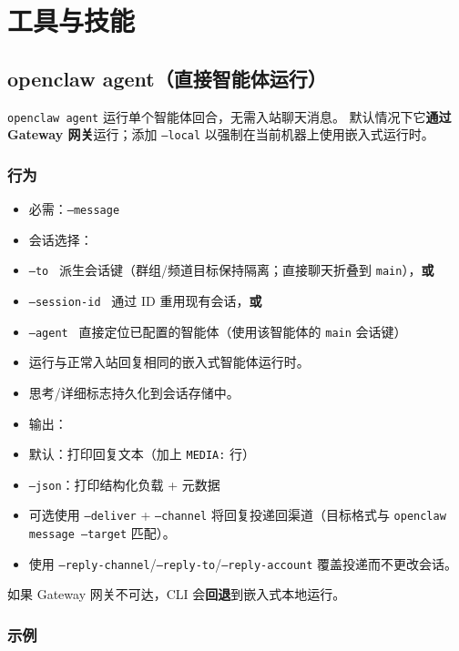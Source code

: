 \chapter{工具与技能}

\section{openclaw agent（直接智能体运行）}


\texttt{openclaw agent} 运行单个智能体回合，无需入站聊天消息。
默认情况下它\textbf{通过 Gateway 网关}运行；添加 \texttt{--local} 以强制在当前机器上使用嵌入式运行时。

\subsection{行为}


\begin{itemize}
  \item 必需：\texttt{--message }
  \item 会话选择：
  \item \texttt{--to } 派生会话键（群组/频道目标保持隔离；直接聊天折叠到 \texttt{main}），\textbf{或}
  \item \texttt{--session-id } 通过 ID 重用现有会话，\textbf{或}
  \item \texttt{--agent } 直接定位已配置的智能体（使用该智能体的 \texttt{main} 会话键）
  \item 运行与正常入站回复相同的嵌入式智能体运行时。
  \item 思考/详细标志持久化到会话存储中。
  \item 输出：
  \item 默认：打印回复文本（加上 \texttt{MEDIA:} 行）
  \item \texttt{--json}：打印结构化负载 + 元数据
  \item 可选使用 \texttt{--deliver} + \texttt{--channel} 将回复投递回渠道（目标格式与 \texttt{openclaw message --target} 匹配）。
  \item 使用 \texttt{--reply-channel}/\texttt{--reply-to}/\texttt{--reply-account} 覆盖投递而不更改会话。
\end{itemize}


如果 Gateway 网关不可达，CLI 会\textbf{回退}到嵌入式本地运行。

\subsection{示例}


